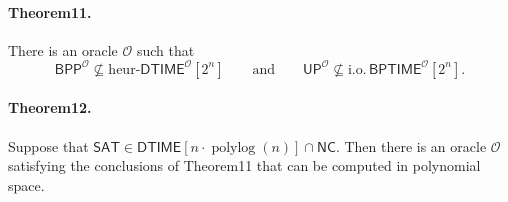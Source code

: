 \paragraph{Theorem11.} There is an oracle $\mathcal O$ such that
\[\mathsf{BPP}^{\mathcal O}\not\subseteq\mathrm{heur}\text{-}\mathsf{DTIME}^{\mathcal O}[2^n]\qquad\text{and}\qquad\mathsf{UP}^{\mathcal O}\not\subseteq\mathrm{i.o.}\,\mathsf{BPTIME}^{\mathcal O}[2^n].\]
\paragraph{Theorem12.} Suppose that $\mathsf{SAT}\in\mathsf{DTIME}[n\cdot\operatorname{polylog}(n)]\cap\mathsf{NC}$. Then there is an oracle $\mathcal O$ satisfying the conclusions of Theorem11 that can be computed in polynomial space.
